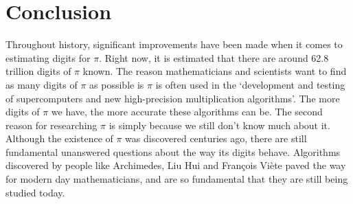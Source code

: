 \documentclass{article}
\begin{document}
\section{Conclusion}
Throughout history, significant improvements have been made when it comes to estimating digits for $\pi$. Right now, it is estimated that there are around 62.8 trillion digits of $\pi$ known. The reason mathematicians and scientists want to find as many digits of $\pi$ as possible is $\pi$ is often used in the `development and testing of supercomputers and new high-precision multiplication algorithms'. \cite{convo} The more digits of $\pi$ we have, the more accurate these algorithms can be. The second reason for researching $\pi$ is simply because we still don't know much about it. Although the existence of $\pi$ was discovered centuries ago, there are still fundamental unanswered questions about the way its digits behave. Algorithms discovered by people like Archimedes, Liu Hui and François Viète paved the way for modern day mathematicians, and are so fundamental that they are still being studied today. 


\printbibliography
\end{document}
